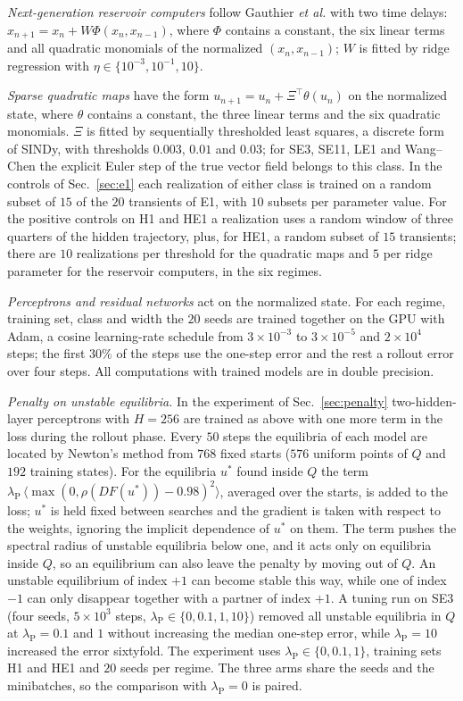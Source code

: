 \documentclass[aip,cha,reprint,amsmath,amssymb,longbibliography]{revtex4-2}
\theoremstyle{definition}
\begin{document}
\emph{Next-generation reservoir computers} follow Gauthier \textit{et al.}\cite{Gauthier2021NGRC} with two time delays:
$x_{n+1}=x_n+W\Phi(x_n,x_{n-1})$, where $\Phi$ contains a constant, the six linear terms and all quadratic monomials of the
normalized $(x_n,x_{n-1})$; $W$ is fitted by ridge regression with $\eta\in\{10^{-3},10^{-1},10\}$.

\emph{Sparse quadratic maps} have the form $u_{n+1}=u_n+\Xi^{\top}\theta(u_n)$ on the normalized state, where $\theta$ contains
a constant, the three linear terms and the six quadratic monomials. $\Xi$ is fitted by sequentially thresholded least
squares, a discrete form of SINDy,\cite{Brunton2016SINDy} with thresholds $0.003$, $0.01$ and $0.03$; for SE3, SE11, LE1 and
Wang--Chen the explicit Euler step of the true vector field belongs to this class. In the controls of
Sec.~\ref{sec:e1} each realization of either class is trained on a random subset of $15$ of the $20$ transients of E1,
with $10$ subsets per parameter value. For the positive controls on H1 and HE1 a realization uses a random window of
three quarters of the hidden trajectory, plus, for HE1, a random subset of $15$ transients; there are $10$ realizations
per threshold for the quadratic maps and $5$ per ridge parameter for the reservoir computers, in the six regimes.

\emph{Perceptrons and residual networks} act on the normalized state. For each regime, training set, class and width the
$20$ seeds are trained together on the GPU with Adam, a cosine learning-rate schedule from $3\times10^{-3}$ to $3\times10^{-5}$
and $2\times10^4$ steps; the first $30\%$ of the steps use the one-step error and the rest a rollout error over four steps.
All computations with trained models are in double precision.

\emph{Penalty on unstable equilibria.} In the experiment of Sec.~\ref{sec:penalty} two-hidden-layer perceptrons with $H=256$
are trained as above with one more term in the loss during the rollout phase. Every $50$ steps the equilibria of each model
are located by Newton's method from $768$ fixed starts ($576$ uniform points of $Q$ and $192$ training states). For the
equilibria $u^*$ found inside $Q$ the term $\lambda_{\mathrm{P}}\,\langle\max(0,\rho(DF(u^*))-0.98)^2\rangle$, averaged over the starts,
is added to the loss; $u^*$ is held fixed between searches and the gradient is taken with respect to the weights, ignoring
the implicit dependence of $u^*$ on them. The term pushes the spectral radius of unstable equilibria below one, and it acts
only on equilibria inside $Q$, so an equilibrium can also leave the penalty by moving out of $Q$. An unstable equilibrium of index $+1$ can become stable
this way, while one of index $-1$ can only disappear together with a partner of index $+1$. A tuning run on SE3 (four seeds,
$5\times10^3$ steps, $\lambda_{\mathrm{P}}\in\{0,0.1,1,10\}$) removed all unstable equilibria in $Q$ at $\lambda_{\mathrm{P}}=0.1$ and $1$ without
increasing the median one-step error, while $\lambda_{\mathrm{P}}=10$ increased the error sixtyfold. The experiment uses $\lambda_{\mathrm{P}}\in\{0,0.1,1\}$,
training sets H1 and HE1 and $20$ seeds per regime. The three arms share the seeds and the minibatches, so the comparison
with $\lambda_{\mathrm{P}}=0$ is paired.
\end{document}

